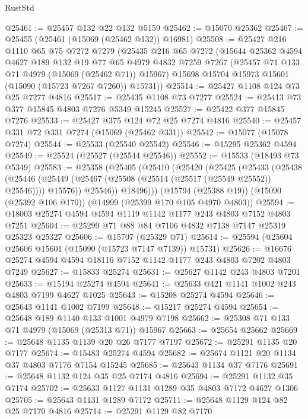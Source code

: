 \begin{lexlean}{RustStd}
\begin{coremodule}
@25461 := @25457 @132 @22 @132 @5159
@25462 := @15070 @25362
@25467 := @25455 (@25461 (@15069 (@25462 @132)) @16981)
@25508 := @25427
    @216
    @1110
    @65
    @75
    @7272
    @7279
    (@25435
      @216
      @65
      @7272
      (@15644
        @25362
        @4594
        @4627
        @189
        @132
        @19
        @77
        @65
        @4979
        @4832
        @7259
        @7267
        (@25457 @71 @133 @71 @4979 (@15069 (@25462 @71)) @15967)
        @15698
        @15704
        @15973
        @15601
        (@15090 (@15723 @7267 @7260))
        @15731))
@25514 := @25427 @1108 @124 @73 @25 @7277 @4816
@25517 := @25435 @1108 @73 @7277
@25524 := @25413 @73 @377 @15845 @4803 @7276 @5349 @15245
@25527 := @25422 @377 @15845 @7276
@25533 := @25427 @375 @124 @72 @25 @7274 @4816
@25540 := @25457 @331 @72 @331 @7274 (@15069 (@25462 @331))
@25542 := @15077 (@15078 @7274)
@25544 := @25533 (@25540 @25542)
@25546 := @15295 @25362 @4594
@25549 := @25524 (@25527 (@25544 @25546))
@25552 := @15533 (@18493 @73 @5349)
@25583 := @25358
    (@25405
      (@25410
        (@25420
          (@25425
            (@25433
              (@25438
                (@25446 (@25449 (@25467 (@25508 (@25514 (@25517 (@25549 @25552)) @25546)))) @15576))
              @25546))
          @18496)))
    (@15794 (@25388 @19))
    (@15090 (@25392 @106 @170))
    (@14999 (@25399 @170 @105 @4970 @4803))
@25594 := @18003 @25274 @4594 @4594 @1119 @1142 @1177 @243 @4803 @7152 @4803 @7251
@25604 := @25299 @71 @88 @84 @7106 @4832 @7138 @7147 @25319 @25323 @25327
@25606 := @15707 (@25329 @71)
@25614 := @25594 (@25604 @25606 @15601 (@15090 (@15723 @7147 @7139)) @15731)
@25626 := @16676 @25274 @4594 @4594 @18116 @7152 @1142 @1177 @243 @4803 @7202 @4803 @7249
@25627 := @15833 @25274
@25631 := @25627 @1142 @243 @4803 @7201
@25633 := @15194 @25274 @4594
@25641 := @25633 @421 @1141 @1002 @243 @4803 @7199 @4627 @1025
@25643 := @15208 @25274 @4594
@25646 := @25643 @1141 @1002 @7199
@25648 := @15217 @25274 @4594
@25654 := @25648 @189 @1140 @133 @1001 @4979 @7198
@25662 := @25308 @71 @133 @71 @4979 (@15069 (@25313 @71)) @15967
@25663 := @25654 @25662
@25669 := @25648 @1135 @1139 @20 @26 @7177 @7197
@25672 := @25291 @1135 @20 @7177
@25674 := @15483 @25274 @4594
@25682 := @25674 @1121 @20 @1134 @37 @4803 @7176 @7154 @15245
@25685 := @25643 @1134 @37 @7176
@25691 := @25648 @1132 @124 @35 @25 @7174 @4816
@25694 := @25291 @1132 @35 @7174
@25702 := @25633 @1127 @1131 @1289 @35 @4803 @7172 @4627 @1306
@25705 := @25643 @1131 @1289 @7172
@25711 := @25648 @1129 @124 @82 @25 @7170 @4816
@25714 := @25291 @1129 @82 @7170

\end{coremodule}
\end{lexlean}
